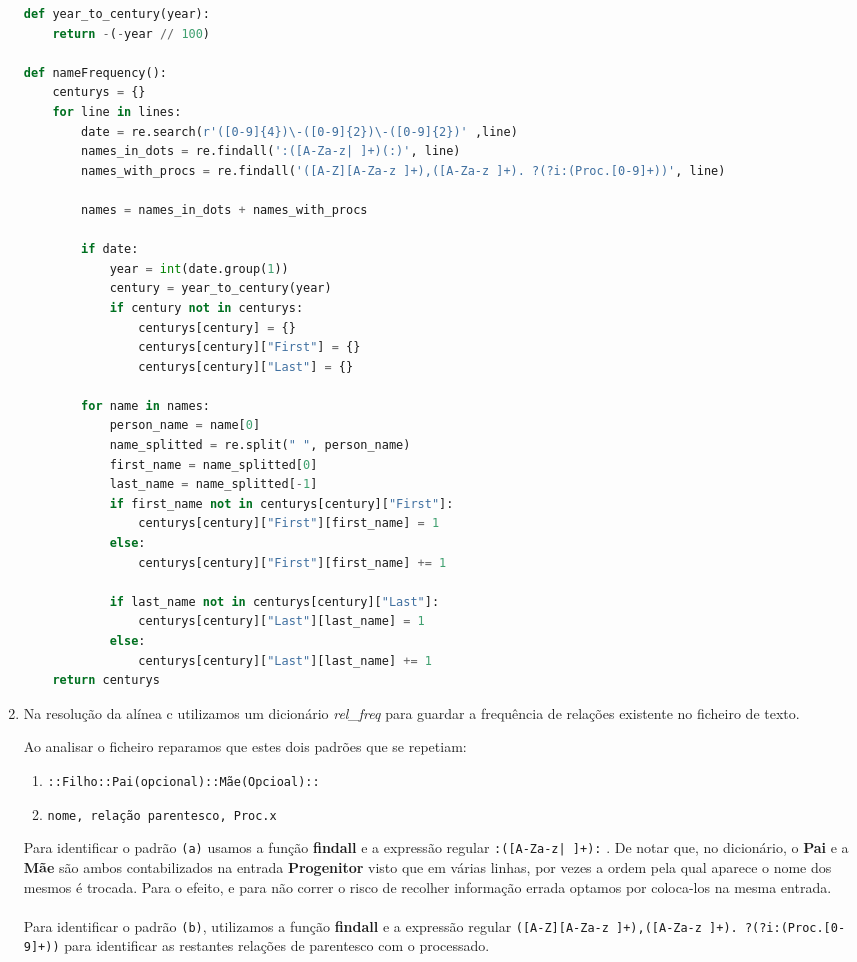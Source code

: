 \documentclass[11pt,a4paper]{report}
\begin{document}
\begin{enumerate}[label=\alph*.]
        \begin{lstlisting}[language=Python]
def year_to_century(year):
    return -(-year // 100)

def nameFrequency():
    centurys = {}
    for line in lines:
        date = re.search(r'([0-9]{4})\-([0-9]{2})\-([0-9]{2})' ,line)
        names_in_dots = re.findall(':([A-Za-z| ]+)(:)', line)
        names_with_procs = re.findall('([A-Z][A-Za-z ]+),([A-Za-z ]+). ?(?i:(Proc.[0-9]+))', line)
 
        names = names_in_dots + names_with_procs
    
        if date:
            year = int(date.group(1))
            century = year_to_century(year)
            if century not in centurys:
                centurys[century] = {}
                centurys[century]["First"] = {}
                centurys[century]["Last"] = {}

        for name in names:
            person_name = name[0] 
            name_splitted = re.split(" ", person_name)
            first_name = name_splitted[0]
            last_name = name_splitted[-1]
            if first_name not in centurys[century]["First"]:
                centurys[century]["First"][first_name] = 1
            else:
                centurys[century]["First"][first_name] += 1

            if last_name not in centurys[century]["Last"]:
                centurys[century]["Last"][last_name] = 1
            else:
                centurys[century]["Last"][last_name] += 1
    return centurys
        \end{lstlisting}

        \item Na resolução da alínea c utilizamos um dicionário \textit{rel\_freq} para guardar a frequência de relações existente no ficheiro de texto. 
        
        Ao analisar o ficheiro reparamos que estes dois padrões que se repetiam:\\
        \begin{enumerate}
            \item \texttt{::Filho::Pai(opcional)::Mãe(Opcioal)::}\\
            \item \texttt{nome, relação parentesco, Proc.x} \\
        \end{enumerate}

        Para identificar o padrão \texttt{(a)} usamos a função \textbf{findall} e a expressão regular \texttt{:([A-Za-z| ]+):} . De notar que, no dicionário, o \textbf{Pai} e a \textbf{Mãe} são ambos contabilizados na entrada \textbf{Progenitor} visto que em várias linhas, por vezes a ordem pela qual aparece o nome dos mesmos é trocada. Para o efeito, e para não correr o risco de recolher informação errada optamos por coloca-los na mesma entrada. \\
        \\
        Para identificar o padrão \texttt{(b)}, utilizamos a função \textbf{findall} e a expressão regular \texttt{([A-Z][A-Za-z ]+),([A-Za-z ]+). ?(?i:(Proc.[0-9]+))} para identificar as restantes relações de parentesco com o processado.
    

\end{enumerate}
\end{document}
